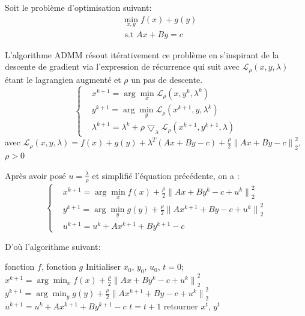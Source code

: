 \documentclass[12pt,a4paper]{report}
\begin{document}
    	Soit le problème d'optimisation suivant:
    	\begin{equation}
        	\label{equa:admm1}
        	\begin{aligned}
            	& \min_{x, y} f(x) + g(y)  \\
            	& \text{ s.t $Ax+ By = c$}
        	\end{aligned}
    	\end{equation}
   	 
    	L'algorithme ADMM résout itérativement ce problème en s'inspirant de la descente de gradient via l'expression de récurrence qui suit avec $\mathcal{L}_\rho (x,y, \lambda)$ étant le lagrangien augmenté et $\rho$ un pas de descente.
    	\begin{equation*}
        	\left\{  
            	\begin{aligned}
                	& x^{k+1} = \arg\min_{x} \mathcal{L}_\rho (x,y^{k}, \lambda^{k}) \\
                	& y^{k+1} = \arg\min_{y} \mathcal{L}_\rho (x^{k+1},y, \lambda^{k}) \\
                	& \lambda^{k+1} = \lambda^{k} + \rho \bigtriangledown_\lambda \mathcal{L}_\rho (x^{k+1},y^{k+1}, \lambda)
            	\end{aligned}
        	\right.
    	\end{equation*}
    	avec $\mathcal{L}_\rho (x,y, \lambda)=f(x) + g(y) + \lambda^T(Ax + By - c) + \frac{\rho}{2}{\| Ax + By - c \|}^2_2$, $\rho > 0$
   	 
    	Après avoir posé $u = \frac{\lambda}{\rho}$ et simplifié l'équation précédente, on a :
    	\begin{equation}
        	\label{equa:admm2}
        	\left\{  
            	\begin{aligned}
                	& x^{k+1} = \arg\min_{x} f(x) + \frac{\rho}{2}{\| Ax + By^k - c + u^k\|}^2_2 \\
                	& y^{k+1} = \arg\min_{y} g(y) + \frac{\rho}{2}{\| Ax^{k+1} + By - c + u^k\|}^2_2 \\
                	& u^{k+1} = u^{k} + Ax^{k+1} + By^{k+1} - c
            	\end{aligned}
        	\right.
    	\end{equation}
   	 
    	D'où l'algorithme suivant:
    	\begin{algorithm}[H]
        	\caption{Algorithme ADMM}
        	\label{alg:admm1}
        	\begin{algorithmic}[1]
        	\REQUIRE fonction $f$, fonction $g$
        	\STATE Initialiser $x_0$, $y_0$, $u_0$, $t=0$;
        	\REPEAT
        	\STATE $x^{k+1} = \arg\min_{x} f(x) + \frac{\rho}{2}{\| Ax + By^k - c + u^k\|}^2_2 $
        	\STATE $y^{k+1} = \arg\min_{y} g(y) + \frac{\rho}{2}{\| Ax^{k+1} + By - c + u^k\|}^2_2$
        	\STATE $u^{k+1} = u^{k} + Ax^{k+1} + By^{k+1} - c$
        	\STATE $t=t+1$
        	\STATE retourner $x^t$, $y^t$
        	\end{algorithmic}
    	\end{algorithm}
   	 
\end{document}
